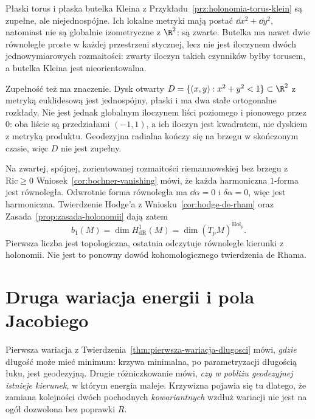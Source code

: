 \begin{przyklad}
\label{prz:de-rham-zalozenia}
Płaski torus i płaska butelka Kleina z
Przykładu~\ref{prz:holonomia-torus-klein} są zupełne,
ale niejednospójne. Ich lokalne metryki mają postać
$\dd x^2+\dd y^2$, natomiast nie są globalnie
izometryczne z $\R^2$: są zwarte. Butelka ma nawet
dwie równoległe proste w każdej przestrzeni stycznej,
lecz nie jest iloczynem dwóch jednowymiarowych
rozmaitości: zwarty iloczyn takich czynników byłby
torusem, a butelka Kleina jest nieorientowalna.

Zupełność też ma znaczenie. Dysk otwarty
$D=\{(x,y):x^2+y^2<1\}\subset\R^2$ z metryką
euklidesową jest jednospójny, płaski i ma dwa stałe
ortogonalne rozkłady. Nie jest jednak globalnym
iloczynem liści poziomego i pionowego przez $0$:
oba liście są przedziałami $(-1,1)$, a ich iloczyn
jest kwadratem, nie dyskiem z metryką produktu.
Geodezyjna radialna kończy się na brzegu w skończonym
czasie, więc $D$ nie jest zupełny.
\end{przyklad}

\begin{uwaga}
\label{uwaga:holonomia-bochner}
Na zwartej, spójnej, zorientowanej rozmaitości
riemannowskiej bez brzegu z $\mathrm{Ric}\geq0$
Wniosek~\ref{cor:bochner-vanishing} mówi, że każda
harmoniczna $1$-forma jest równoległa. Odwrotnie
forma równoległa ma $\dd\alpha=0$ i $\delta\alpha=0$,
więc jest harmoniczna. Twierdzenie Hodge'a
z Wniosku~\ref{cor:hodge-de-rham} oraz
Zasada~\ref{prop:zasada-holonomii} dają zatem
\[
 b_1(M)=\dim H^1_{\mathrm{dR}}(M)
       =\dim (T_pM)^{\operatorname{Hol}_p}.
\]
Pierwsza liczba jest topologiczna, ostatnia odczytuje
równoległe kierunki z holonomii. Nie jest to ponowny
dowód kohomologicznego twierdzenia de Rhama.
\end{uwaga}

\section{Druga wariacja energii i pola Jacobiego}
\label{sec:druga-wariacja-jacobi}

Pierwsza wariacja z
Twierdzenia~\ref{thm:pierwsza-wariacja-dlugosci}
mówi, \emph{gdzie} długość może mieć minimum:
krzywa minimalna, po parametryzacji długością łuku,
jest geodezyjną. Drugie różniczkowanie mówi,
\emph{czy w pobliżu geodezyjnej istnieje kierunek},
w którym energia maleje. Krzywizna pojawia się
tu dlatego, że zamiana kolejności dwóch pochodnych
\emph{kowariantnych} wzdłuż wariacji nie jest
na ogół dozwolona bez poprawki $R$.

